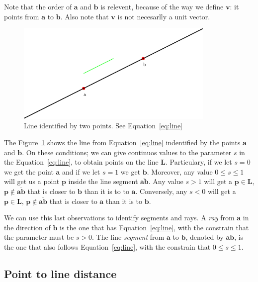Note that the order of $\mathbf{a}$ and $\mathbf{b}$ is relevent, because of the way we define $\mathbf{v}$: it points from $\mathbf{a}$ to $\mathbf{b}$.
Also note that $\mathbf{v}$ is not necesarlly a unit vector. 

\begin{figure}[htb]
  \centering
  \includegraphics[width=0.85\textwidth]{img/line}
  \caption{Line identified by two points. See Equation~\ref{eq:line} }
  \label{fig:line}
\end{figure}

The Figure~\ref{fig:line} shows the line from Equation~\ref{eq:line} indentified by the points $\mathbf{a}$ and $\mathbf{b}$.
On these conditions; we can give continuos values to the parameter $s$ in the Equation~\ref{eq:line}, to obtain points on the line $\mathbf{L}$.
Particulary, if we let $s = 0$ we get the point $\mathbf{a}$ and if we let $s = 1$ we get  
$\mathbf{b}$.
Moreover, any value $0 \leq s \leq 1$ will get us a point $\mathbf{p}$ inside the line segment $\overline{\mathbf{a} \mathbf{b}}$.
Any value $s > 1$ will get a $\mathbf{p} \in \mathbf{L}$, $\mathbf{p} \notin \overline{\mathbf{a} \mathbf{b}}$ that is closer to $\mathbf{b}$ than it is to to $\mathbf{a}$.
Conversely, any $s < 0$ will get a $\mathbf{p} \in \mathbf{L}$, $\mathbf{p} \notin \overline{\mathbf{a} \mathbf{b}}$ that is closer to $\mathbf{a}$ than it is to $\mathbf{b}$.

We can use this last observations to identify segments and rays.
A \emph{ray} from $\mathbf{a}$ in the direction of $\mathbf{b}$ is the one that has Equation~\ref{eq:line}, with the constrain that the parameter must be $s > 0$.
The line \emph{segment} from $\mathbf{a}$ to $\mathbf{b}$, denoted by $\overline{\mathbf{a} \mathbf{b}}$, is the one that also follows Equation~\ref{eq:line}, with the constrain that   $0 \leq s \leq 1$.

\subsection{Point to line distance}

